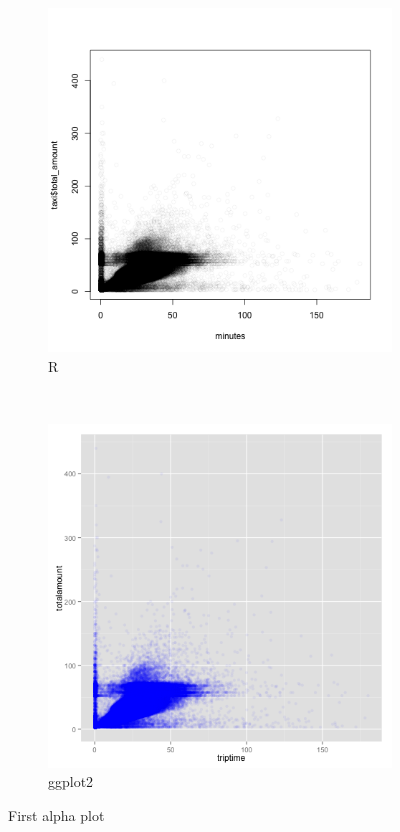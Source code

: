 \documentclass[]{article}
\begin{document}
\begin{figure}
\begin{subfigure}[b]{0.3\textwidth}
                \includegraphics[width=\textwidth]{R/alpha.png}
                \caption{R}
        \end{subfigure}
        ~ %
        \begin{subfigure}[b]{0.3\textwidth}
                \includegraphics[width=\textwidth]{ggplot2/alpha.png}
                \caption{ggplot2}
        \end{subfigure}
        \caption{First alpha plot}
\end{figure}
\end{document}
